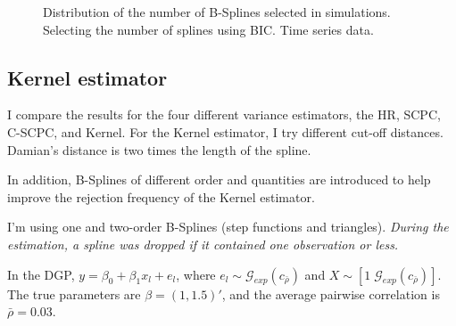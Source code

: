\documentclass[
]{article}
\begin{document}
\begin{figure}

\begin{minipage}[t]{0.50\linewidth}

{\centering 


}

\end{minipage}%
%
\begin{minipage}[t]{0.50\linewidth}

{\centering 


}

\end{minipage}%

\caption{\label{fig-bic-splines-ts}Distribution of the number of
B-Splines selected in simulations. Selecting the number of splines using
BIC. Time series data.}

\end{figure}

\hypertarget{sec-kernel}{%
\subsection{Kernel estimator}\label{sec-kernel}}

I compare the results for the four different variance estimators, the
HR, SCPC, C-SCPC, and Kernel. For the Kernel estimator, I try different
cut-off distances. Damian's distance is two times the length of the
spline.

In addition, B-Splines of different order and quantities are introduced
to help improve the rejection frequency of the Kernel estimator.

I'm using one and two-order B-Splines (step functions and triangles).
\emph{During the estimation, a spline was dropped if it contained one
observation or less.}

In the DGP, \(y=\beta_0 + \beta_1 x_l +e_l\), where
\(e_l\sim\mathcal{G}_{exp}(c_{\bar\rho})\) and
\(X\sim[1 \;\mathcal{G}_{exp}(c_{\bar\rho})]\). The true parameters are
\(\beta=(1, 1.5)'\), and the average pairwise correlation is
\(\bar\rho=0.03\).
\end{document}
